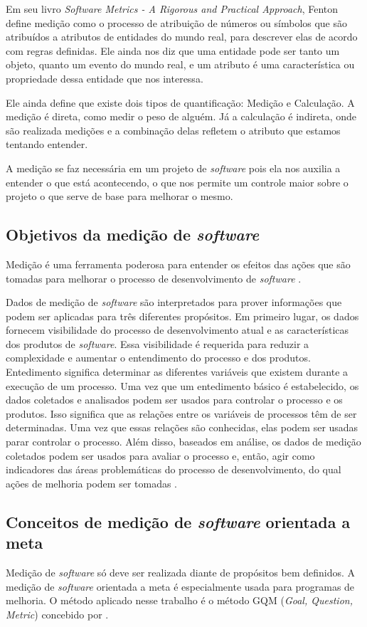 Em seu livro \textit{Software Metrics - A Rigorous and Practical Approach}, Fenton define
medição como o processo de atribuição de números ou símbolos que são atribuídos
a atributos de entidades do mundo real, para descrever elas de acordo com regras
definidas. Ele ainda nos diz que uma entidade pode ser tanto um objeto, quanto
um evento do mundo real, e um atributo é uma característica ou propriedade dessa
entidade que nos interessa.

Ele ainda define que existe dois tipos de quantificação: Medição e Calculação.
A medição é direta, como medir o peso de alguém. Já a calculação é indireta, onde
são realizada medições e a combinação delas refletem o atributo que estamos
tentando entender.

A medição se faz necessária em um projeto de \textit{software} pois ela nos auxilia a
entender o que está acontecendo, o que nos permite um controle maior sobre o
projeto o que serve de base para melhorar o mesmo.

\subsection{Objetivos da medição de \textit{software}}
Medição é uma ferramenta poderosa para entender os efeitos das ações que são
tomadas para melhorar o processo de desenvolvimento de \textit{software}
\cite{egon}.

Dados de medição de \textit{software} são interpretados para prover informações que podem
ser aplicadas para três diferentes propósitos. Em primeiro lugar, os dados
fornecem visibilidade do processo de desenvolvimento atual e as características
dos produtos de \textit{software}. Essa visibilidade é requerida para reduzir a complexidade
e aumentar o entendimento do processo e dos produtos. Entedimento significa
determinar as diferentes variáveis que existem durante a execução de um processo.
Uma vez que um entedimento básico é estabelecido, os dados coletados e analisados
podem ser usados para controlar o processo e os produtos. Isso significa que as
relações entre os variáveis de processos têm de ser determinadas. Uma vez que
 essas relações são conhecidas, elas podem ser usadas parar controlar o processo.
 Além disso, baseados em análise, os dados de medição coletados podem ser usados
 para avaliar o processo e, então, agir como indicadores das áreas problemáticas
 do processo de desenvolvimento, do qual ações de melhoria podem ser tomadas
 \cite{pfleeger}.

\subsection{Conceitos de medição de \textit{software} orientada a meta}
Medição de \textit{software} só deve ser realizada diante de propósitos bem definidos.
A medição de \textit{software} orientada a meta é especialmente usada para programas de
 melhoria. O método aplicado nesse trabalho é o método GQM (\textit{Goal, Question, Metric})
 concebido por \cite{basiliRombach}.

